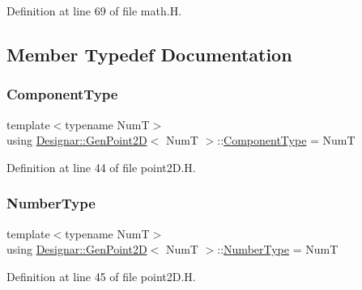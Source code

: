 Definition at line 69 of file math.\+H.



\subsection{Member Typedef Documentation}
\mbox{\label{class_designar_1_1_gen_point2_d_a8d80993f38dab83a39e80a50db08b944}} 
\subsubsection{\texorpdfstring{Component\+Type}{ComponentType}}
{\footnotesize\ttfamily template$<$typename NumT$>$ \\
using \hyperlink{class_designar_1_1_gen_point2_d}{Designar\+::\+Gen\+Point2D}$<$ NumT $>$\+::\hyperlink{class_designar_1_1_gen_point2_d_a8d80993f38dab83a39e80a50db08b944}{Component\+Type} =  NumT}



Definition at line 44 of file point2\+D.\+H.

\mbox{\label{class_designar_1_1_gen_point2_d_a6ad786447c17adc8cbaece7f12ac2132}} 
\subsubsection{\texorpdfstring{Number\+Type}{NumberType}}
{\footnotesize\ttfamily template$<$typename NumT$>$ \\
using \hyperlink{class_designar_1_1_gen_point2_d}{Designar\+::\+Gen\+Point2D}$<$ NumT $>$\+::\hyperlink{class_designar_1_1_gen_point2_d_a6ad786447c17adc8cbaece7f12ac2132}{Number\+Type} =  NumT}



Definition at line 45 of file point2\+D.\+H.

\mbox{\label{class_designar_1_1_gen_point2_d_a8f13f44ca3438223d1ecdce2728b9437}} 
